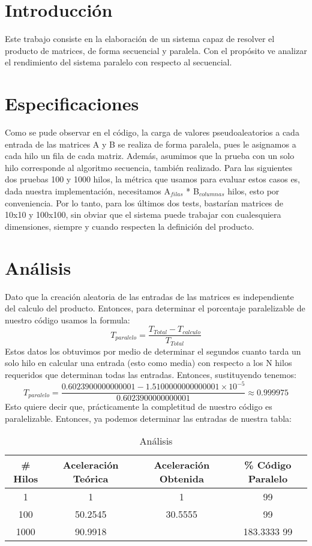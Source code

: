 \documentclass[10pt,letterpaper]{article}
\begin{document}
\section*{Introducción}
Este trabajo consiste en la elaboración de un sistema capaz de resolver el producto de matrices, de forma secuencial y paralela. Con el propósito ve analizar el rendimiento del sistema paralelo con respecto al secuencial. 
\section*{Especificaciones}
Como se pude observar en el código, la carga de valores pseudoaleatorios a cada entrada de las matrices A y B se realiza de forma paralela, pues le asignamos a cada hilo un fila de cada matriz. Además, asumimos que la prueba con un solo hilo corresponde al algoritmo secuencia, también realizado. Para las siguientes dos pruebas 100 y 1000 hilos, la métrica que usamos para evaluar estos casos es, dada nuestra implementación, necesitamos A$_{filas}$ * B$_{columnas}$ hilos, esto por conveniencia. Por lo tanto, para los últimos dos tests, bastarían matrices de 10x10 y 100x100, sin obviar que el sistema puede trabajar con cualesquiera dimensiones, siempre y cuando respecten la definición del producto.
\section*{Análisis}
Dato que la creación aleatoria de las entradas de las matrices es independiente del calculo del producto. Entonces, para determinar el porcentaje paralelizable de nuestro código usamos la formula:
\begin{equation}
T_{paralelo} = \frac{T_{Total} - T_{calculo}}{T_{Total}}
\end{equation}
Estos datos los obtuvimos por medio de determinar el segundos cuanto tarda un solo hilo en calcular una entrada (esto como media) con respecto a los N hilos requeridos que determinan todas las entradas. Entonces, sustituyendo tenemos:
\begin{equation}
T_{paralelo} = \frac{0.6023900000000001 - 1.5100000000000001 \times 10^{-5}}{0.6023900000000001} \approx
0.999975
\end{equation}
Esto quiere decir que, prácticamente la completitud de nuestro código es paralelizable. Entonces, ya podemos determinar las entradas de nuestra tabla:
\begin{table}[h]
    \centering
    \begin{tabular}{|c|c|c|c|}
    \hline
         \# Hilos & Aceleración Teórica & Aceleración Obtenida & \% Código Paralelo\\
    \hline
     1& 1 & 1 &  99\\
    \hline
    100& 50.2545 & 30.5555 &  99\\
    \hline
    1000& 90.9918 & & 183.3333 99\\
    \hline
    \end{tabular}
    \caption{Análisis}
    \label{tab:my_label}
\end{table}
\end{document}
